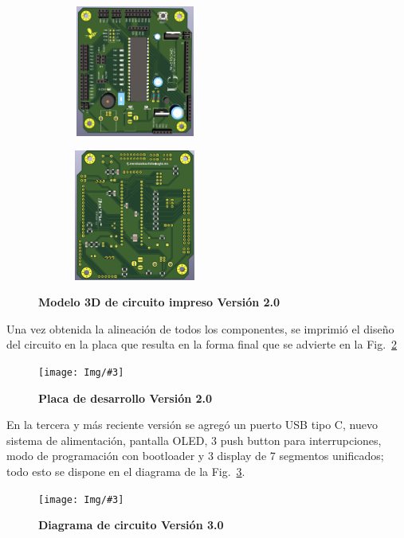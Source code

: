 \documentclass[times, 10pt,twocolumn]{article}
\newcommand{\Img}[5]{
   \begin{figure}[H]
   	   \centering
       \texttt{[image: Img/\#3]}
       \caption{ \centering \textbf{\small #4}}
       \label{#5}
       \end{figure}
   }
\begin{document}
\begin{figure}[htbp]
  \begin{subfigure}[b]{0.4\columnwidth}
    \includegraphics[width=4.3cm, height=4.3cm]{Img/segunda_version_3d.png}
  \end{subfigure}
  \hspace{0.7cm}
  \begin{subfigure}[b]{0.4\columnwidth}
    \includegraphics[width=4.3cm, height=4.3cm]{Img/segunda_version_pcb_b.png}
  \end{subfigure}
   \caption{\centering \textbf{Modelo 3D de circuito impreso Versión 2.0}} 
   \label{fig:7}
 \end{figure}


Una vez obtenida la alineación de todos los componentes, se imprimió el diseño del circuito en la placa que resulta en la forma final que se advierte en la Fig.~\ref{fig:8}
\Img{7.5cm}{7.0cm}{segunda_version_final}{Placa de desarrollo Versión 2.0}{fig:8}


En la tercera y más reciente versión se agregó un puerto USB tipo C, nuevo sistema de alimentación, pantalla OLED, 3 push button para interrupciones, modo de programación con bootloader y 3 display de 7 segmentos unificados; todo esto se dispone en el diagrama de la Fig.~\ref{fig:9}.
\Img{8.5cm}{7.0cm}{Tercera_Version}{Diagrama de circuito Versión 3.0}{fig:9}
\end{document}
